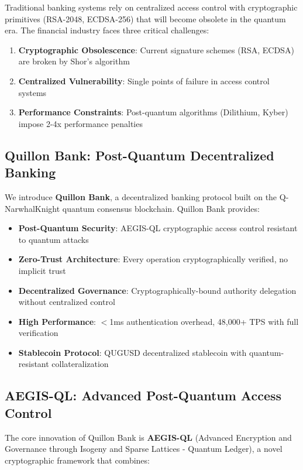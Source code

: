 \documentclass[11pt,a4paper]{article}
\begin{document}
Traditional banking systems rely on centralized access control with cryptographic primitives (RSA-2048, ECDSA-256) that will become obsolete in the quantum era. The financial industry faces three critical challenges:

\begin{enumerate}[leftmargin=*]
    \item \textbf{Cryptographic Obsolescence}: Current signature schemes (RSA, ECDSA) are broken by Shor's algorithm
    \item \textbf{Centralized Vulnerability}: Single points of failure in access control systems
    \item \textbf{Performance Constraints}: Post-quantum algorithms (Dilithium, Kyber) impose 2-4x performance penalties
\end{enumerate}

\subsection{Quillon Bank: Post-Quantum Decentralized Banking}

We introduce \textbf{Quillon Bank}, a decentralized banking protocol built on the Q-NarwhalKnight quantum consensus blockchain. Quillon Bank provides:

\begin{itemize}[leftmargin=*]
    \item \textbf{Post-Quantum Security}: AEGIS-QL cryptographic access control resistant to quantum attacks
    \item \textbf{Zero-Trust Architecture}: Every operation cryptographically verified, no implicit trust
    \item \textbf{Decentralized Governance}: Cryptographically-bound authority delegation without centralized control
    \item \textbf{High Performance}: $<$1ms authentication overhead, 48,000+ TPS with full verification
    \item \textbf{Stablecoin Protocol}: QUGUSD decentralized stablecoin with quantum-resistant collateralization
\end{itemize}

\subsection{AEGIS-QL: Advanced Post-Quantum Access Control}

The core innovation of Quillon Bank is \textbf{AEGIS-QL} (Advanced Encryption and Governance through Isogeny and Sparse Lattices - Quantum Ledger), a novel cryptographic framework that combines:
\end{document}
